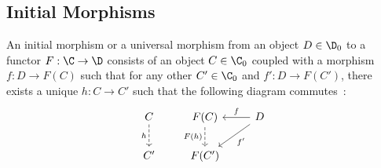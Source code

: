 \subsection*{Initial Morphisms}

\begin{definition}
	An initial morphism or a universal morphism from an object $D\in \D_0$ to a
	functor $F:\C\to \D$ consists of an object $C\in \C_0$ coupled with a morphism
	$f: D\to F(C)$ such that for any other $C'\in \C_0$ and $f': D \to F(C')$,
	there exists a unique $h:C\to C'$ such that the following diagram
	commutes~\parencite[p.~55]{lane:working_mathematician}:
	\[\begin{tikzcd}[ampersand replacement=\&]
		C \& {F(C)} \& D \\
		{C'} \& {F(C')}
		\arrow["h"', dashed, from=1-1, to=2-1]
		\arrow["{F(h)}"', dashed, from=1-2, to=2-2]
		\arrow["{f'}", from=1-3, to=2-2]
		\arrow["f"', from=1-3, to=1-2]
	\end{tikzcd}\]
\end{definition}

